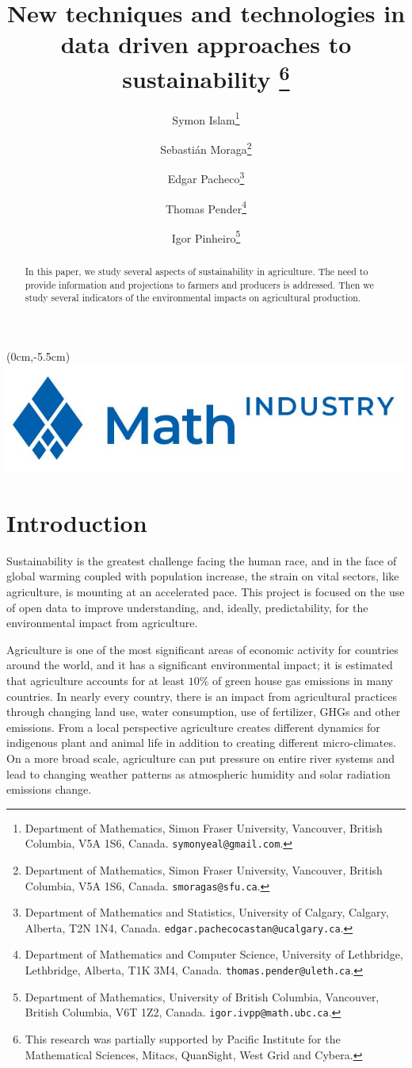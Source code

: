 \documentclass[11pt]{article}
\title{New techniques and technologies in data driven approaches to sustainability
\thanks{This research was 
partially supported by  Pacific Institute for the Mathematical Sciences, Mitacs, QuanSight, West Grid and Cybera.}}
\author{
{\sc Symon Islam}\thanks{Department of Mathematics, Simon Fraser University, Vancouver, British Columbia, V5A 1S6, Canada. {\tt symonyeal@gmail.com}.}
\and
{\sc Sebasti\'an Moraga}\thanks{ Department of Mathematics, Simon Fraser University, Vancouver, British Columbia, V5A 1S6, Canada. {\tt smoragas@sfu.ca}.}
\and
{\sc Edgar Pacheco}\thanks{Department of Mathematics and Statistics, University of Calgary, Calgary, Alberta, T2N 1N4, Canada. {\tt edgar.pachecocastan@ucalgary.ca}.}
\and
{\sc Thomas Pender}\thanks{Department of Mathematics and Computer Science, University of Lethbridge, Lethbridge, Alberta, T1K 3M4, Canada. {\tt thomas.pender@uleth.ca}.}
\and
{\sc Igor Pinheiro}\thanks{Department of Mathematics, University of British Columbia, Vancouver, British Columbia, V6T 1Z2, Canada. {\tt igor.ivpp@math.ubc.ca}.}
}
\date{}
\numberwithin{equation}{section}
\begin{document}
\maketitle
\begin{textblock*}{2cm}(0cm,-5.5cm)
  \includegraphics[scale=0.1]{m2pilogo}%
\end{textblock*}

\begin{abstract}
\noindent In this paper, we study several aspects of sustainability in agriculture. The need to provide information and projections to farmers and producers is addressed. Then we study several indicators of the environmental impacts on agricultural production.
\end{abstract}

\smallskip\noindent

                                                  

\section{Introduction}\label{introduction}

Sustainability is the greatest challenge facing the human race, and in the face of global warming coupled with population increase, the strain on vital sectors, like agriculture, is mounting at an accelerated pace. This project is focused on the use of open data to improve understanding, and, ideally, predictability, for the environmental impact from agriculture. 

Agriculture is one of the most significant areas of economic activity for countries around the world, and it has a significant environmental impact; it is estimated that agriculture accounts for at least $10\%$ of green house gas emissions in many countries. In nearly every country, there is an impact from agricultural practices through changing land use, water consumption, use of fertilizer, GHGs and other emissions. From a local perspective agriculture creates different dynamics for indigenous plant and animal life in addition to creating different micro-climates. On a more broad scale, agriculture can put pressure on entire river systems and lead to changing weather patterns as atmospheric humidity and solar radiation emissions change.
\end{document}
